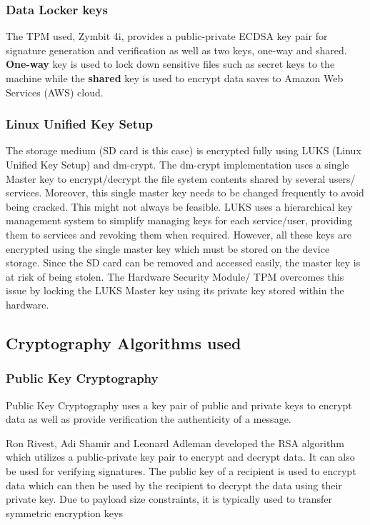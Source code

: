 \documentclass[11pt,openright]{report}
\begin{document}
\subsubsection{Data Locker keys}
The TPM used, Zymbit 4i, provides a public-private ECDSA key pair for signature generation and verification as well as two keys, one-way and shared. \textbf{One-way} key is used to lock down sensitive files such as secret keys to the machine while the \textbf{shared} key is used to encrypt data saves to Amazon Web Services (AWS) cloud. 

\subsubsection{Linux Unified Key Setup}
The storage medium (SD card is this case) is encrypted fully using LUKS (Linux Unified Key Setup) and dm-crypt. The dm-crypt implementation uses a single Master key to encrypt/decrypt the file system contents shared by several users/ services. Moreover, this single master key needs to be changed frequently to avoid being cracked. This might not always be feasible. LUKS uses a hierarchical key management system to simplify managing keys for each service/user, providing them to services and revoking them when required. However, all these keys are encrypted using the single master key which must be stored on the device storage. Since the SD card can be removed and accessed easily, the master key is at risk of being stolen. The Hardware Security Module/ TPM overcomes this issue by locking the LUKS Master key using its private key stored within the hardware.

\subsection{Cryptography Algorithms used}
\subsubsection{Public Key Cryptography}
Public Key Cryptography uses a key pair of public and private keys to encrypt data as well as provide verification the authenticity of a message.

Ron Rivest, Adi Shamir and Leonard Adleman developed the RSA algorithm which utilizes a public-private key pair to encrypt and decrypt data. It can also be used for verifying signatures. The public key of a recipient is used to encrypt data which can then be used by the recipient to decrypt the data using their private key. Due to payload size constraints, it is typically used to transfer symmetric encryption keys
\end{document}
